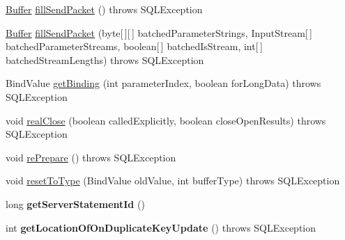 \begin{DoxyCompactItemize}
\item 
\mbox{\hyperlink{classcom_1_1mysql_1_1jdbc_1_1_buffer}{Buffer}} \mbox{\hyperlink{classcom_1_1mysql_1_1jdbc_1_1_server_prepared_statement_acb89d97637dff8b751928da915cecda1}{fill\+Send\+Packet}} ()  throws S\+Q\+L\+Exception 
\item 
\mbox{\hyperlink{classcom_1_1mysql_1_1jdbc_1_1_buffer}{Buffer}} \mbox{\hyperlink{classcom_1_1mysql_1_1jdbc_1_1_server_prepared_statement_a923aa3af88e20d5927f9dbb827539724}{fill\+Send\+Packet}} (byte\mbox{[}$\,$\mbox{]}\mbox{[}$\,$\mbox{]} batched\+Parameter\+Strings, Input\+Stream\mbox{[}$\,$\mbox{]} batched\+Parameter\+Streams, boolean\mbox{[}$\,$\mbox{]} batched\+Is\+Stream, int\mbox{[}$\,$\mbox{]} batched\+Stream\+Lengths)  throws S\+Q\+L\+Exception 
\item 
Bind\+Value \mbox{\hyperlink{classcom_1_1mysql_1_1jdbc_1_1_server_prepared_statement_abe61386d18ae6ff80a37435054d1ab98}{get\+Binding}} (int parameter\+Index, boolean for\+Long\+Data)  throws S\+Q\+L\+Exception 
\item 
void \mbox{\hyperlink{classcom_1_1mysql_1_1jdbc_1_1_server_prepared_statement_af12056e4aca4279abd972fbbba2f320f}{real\+Close}} (boolean called\+Explicitly, boolean close\+Open\+Results)  throws S\+Q\+L\+Exception 
\item 
void \mbox{\hyperlink{classcom_1_1mysql_1_1jdbc_1_1_server_prepared_statement_ac01f8aa54deb0cea5d132b02377feb5b}{re\+Prepare}} ()  throws S\+Q\+L\+Exception 
\item 
void \mbox{\hyperlink{classcom_1_1mysql_1_1jdbc_1_1_server_prepared_statement_a9752e8c4db0cfe68dba1503bfffb9919}{reset\+To\+Type}} (Bind\+Value old\+Value, int buffer\+Type)  throws S\+Q\+L\+Exception 
\item 
\mbox{\label{classcom_1_1mysql_1_1jdbc_1_1_server_prepared_statement_a3d404cb35e9bc9d0316134e04d343b3a}} 
long {\bfseries get\+Server\+Statement\+Id} ()
\item 
\mbox{\label{classcom_1_1mysql_1_1jdbc_1_1_server_prepared_statement_ab7301c98c65f134d6e81066c74247894}} 
int {\bfseries get\+Location\+Of\+On\+Duplicate\+Key\+Update} ()  throws S\+Q\+L\+Exception 
\item 
\mbox{\label{classcom_1_1mysql_1_1jdbc_1_1_server_prepared_statement_a2c7797f73391ce5c4f131754fca6b2b3}} 

\end{DoxyCompactItemize}
